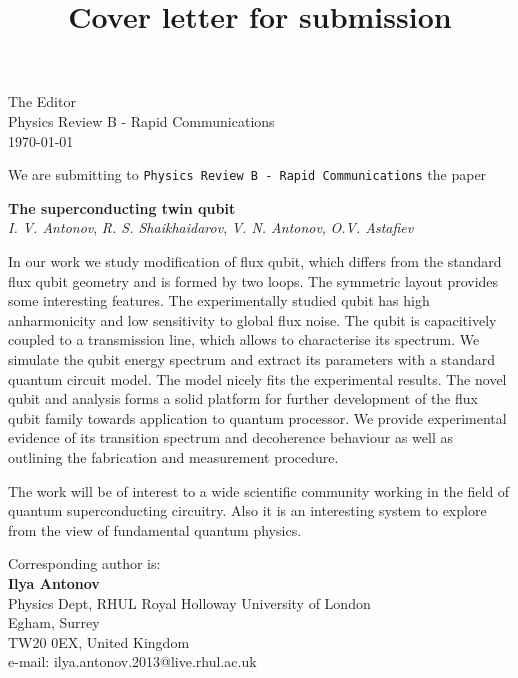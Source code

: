 \documentclass[%
superscriptaddress,
preprint,
preprintnumbers,
bibnotes,
amsmath,
amssymb,
aps,
showkeys,
prb,
]{revtex4-2}
\begin{document}
\begin{flushleft}
  The Editor\\
  Physics Review B - Rapid Communications\\
  \today
\end{flushleft}

\title{Cover letter for submission}

\maketitle






\noindent We are submitting to \texttt{Physics Review B - Rapid Communications} the paper
\begin{center}
  \textbf{The superconducting twin qubit}\\
  \emph{I.  V.  Antonov}, \emph{R. S.  Shaikhaidarov}, \emph{V.  N.  Antonov}, \emph{O.V.  Astafiev}
\end{center}


\noindent In our work we study modification of flux qubit, which differs from the standard flux qubit geometry and is formed by two loops. The symmetric layout provides some interesting features. The experimentally studied qubit has high anharmonicity and low sensitivity to global flux noise. The qubit is capacitively coupled to a transmission line, which allows to characterise its spectrum. We simulate the qubit energy spectrum and extract its parameters with a standard quantum circuit model. The model nicely fits the experimental results. The novel qubit and analysis forms a solid platform for further development of the flux qubit family towards application to quantum processor. We provide experimental evidence of its transition spectrum and decoherence behaviour as well as outlining the fabrication and measurement procedure.

The work will be of interest to a wide scientific community working in the field of quantum superconducting circuitry. Also it is an interesting system to explore from the view of fundamental quantum physics.

\vspace{1em}
\begin{flushleft}
  Corresponding author is:\\
\textbf{Ilya Antonov}\\
Physics Dept, RHUL Royal Holloway University of London\\
Egham, Surrey\\
TW20 0EX, United Kingdom\\
e-mail: ilya.antonov.2013@live.rhul.ac.uk\\
\end{flushleft}
\end{document}
